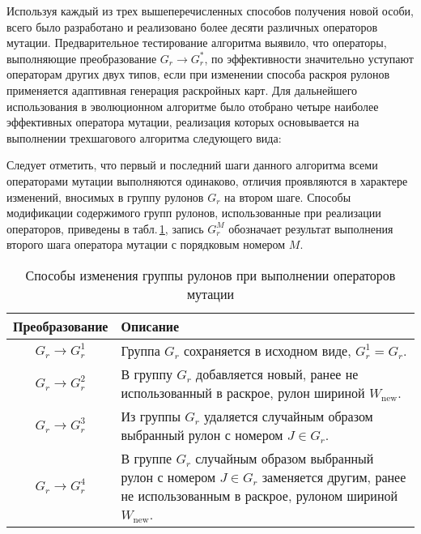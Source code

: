 \documentclass[12pt]{article}
\newcommand\tablecaption[1]{
    \captionsetup{labelsep=newline,justification=centering}
    \caption{#1}
}
\begin{document}
Используя каждый из трех вышеперечисленных способов получения новой особи, 
всего было разработано и реализовано более десяти различных операторов мутации. 
Предварительное тестирование алгоритма выявило, что операторы, выполняющие 
преобразование $G_r \rightarrow G_r^*$, по эффективности значительно уступают 
операторам других двух типов, если при изменении способа раскроя рулонов 
применяется адаптивная генерация раскройных карт. Для дальнейшего использования 
в эволюционном алгоритме было отобрано четыре наиболее эффективных оператора 
мутации, реализация которых основывается на выполнении трехшагового алгоритма 
следующего вида:

Следует отметить, что первый и последний шаги данного алгоритма всеми 
операторами мутации выполняются одинаково, отличия проявляются в характере 
изменений, вносимых в группу рулонов $G_r$ на втором шаге. Способы модификации 
содержимого групп рулонов, использованные при реализации операторов, приведены 
в табл.\,\ref{tab:mutation}, 
запись $G_r^M$ обозначает результат выполнения второго шага 
оператора мутации с порядковым номером $M$.
\begin{table}[ht]
    \centering
    \tablecaption{Способы изменения группы рулонов при выполнении операторов 
        мутации}
    \label{tab:mutation}    
    \begin{tabular}{|c|p{}|}
        \hline Преобразование & Описание \\ \hline
        $G_r \rightarrow G_r^1$ & 
            Группа $G_r$ сохраняется в исходном виде, $G_r^1=G_r$. \\ \hline
        $G_r \rightarrow G_r^2$ & 
            В группу $G_r$ добавляется новый, ранее не использованный в 
            раскрое, рулон шириной $W_{\text{new}}$. \\ \hline
        $G_r \rightarrow G_r^3$ & 
            Из группы $G_r$ удаляется случайным образом выбранный рулон с 
            номером $J \in G_r$. \\ \hline
        $G_r \rightarrow G_r^4$ &
             В группе $G_r$ случайным образом выбранный рулон с номером 
             $J \in G_r$ заменяется другим, ранее не использованным в раскрое, 
             рулоном шириной $W_{\text{new}}$. \\ \hline
    \end{tabular}    
\end{table}
\end{document}
